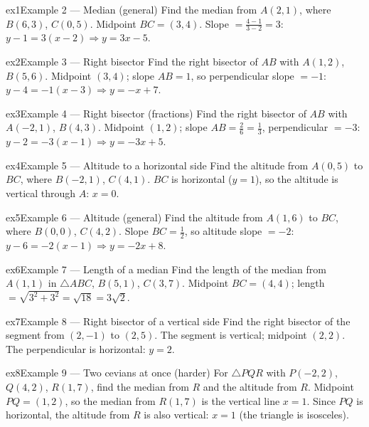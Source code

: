 \documentclass[11pt]{article}
\begin{document}
\begin{example}{ex1}{Example 2 --- Median (general)}
Find the median from $A(2,1)$, where $B(6,3)$, $C(0,5)$.
\soln Midpoint $BC=(3,4)$. Slope $=\tfrac{4-1}{3-2}=3$: $y-1=3(x-2)\Rightarrow y=3x-5.$
\end{example}

\begin{example}{ex2}{Example 3 --- Right bisector}
Find the right bisector of $AB$ with $A(1,2)$, $B(5,6)$.
\soln Midpoint $(3,4)$; slope $AB=1$, so perpendicular slope $=-1$: $y-4=-1(x-3)\Rightarrow y=-x+7.$
\end{example}

\begin{example}{ex3}{Example 4 --- Right bisector (fractions)}
Find the right bisector of $AB$ with $A(-2,1)$, $B(4,3)$.
\soln Midpoint $(1,2)$; slope $AB=\tfrac{2}{6}=\tfrac13$, perpendicular $=-3$: $y-2=-3(x-1)\Rightarrow y=-3x+5.$
\end{example}

\begin{example}{ex4}{Example 5 --- Altitude to a horizontal side}
Find the altitude from $A(0,5)$ to $BC$, where $B(-2,1)$, $C(4,1)$.
\soln $BC$ is horizontal ($y=1$), so the altitude is vertical through $A$: $x=0.$
\end{example}

\begin{example}{ex5}{Example 6 --- Altitude (general)}
Find the altitude from $A(1,6)$ to $BC$, where $B(0,0)$, $C(4,2)$.
\soln Slope $BC=\tfrac12$, so altitude slope $=-2$: $y-6=-2(x-1)\Rightarrow y=-2x+8.$
\end{example}

\begin{example}{ex6}{Example 7 --- Length of a median}
Find the length of the median from $A(1,1)$ in $\triangle ABC$, $B(5,1)$, $C(3,7)$.
\soln Midpoint $BC=(4,4)$; length $=\sqrt{3^2+3^2}=\sqrt{18}=3\sqrt2.$
\end{example}

\begin{example}{ex7}{Example 8 --- Right bisector of a vertical side}
Find the right bisector of the segment from $(2,-1)$ to $(2,5)$.
\soln The segment is vertical; midpoint $(2,2)$. The perpendicular is horizontal: $y=2.$
\end{example}

\begin{example}{ex8}{Example 9 --- Two cevians at once (harder)}
For $\triangle PQR$ with $P(-2,2)$, $Q(4,2)$, $R(1,7)$, find the median from $R$ and the altitude from $R$.
\soln Midpoint $PQ=(1,2)$, so the median from $R(1,7)$ is the vertical line $x=1$. Since $PQ$ is horizontal, the altitude from $R$ is also vertical: $x=1$ (the triangle is isosceles).
\end{example}
\end{document}

